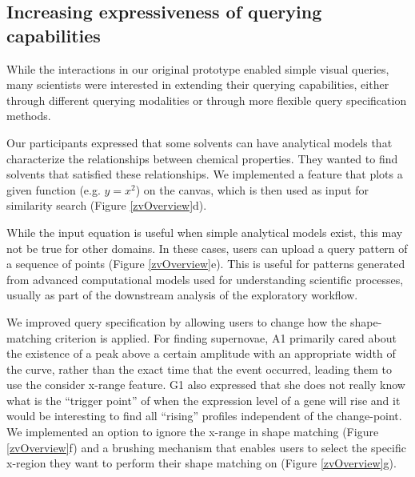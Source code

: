 \subsection{Increasing expressiveness of querying capabilities}
\par While the interactions in our original prototype enabled simple visual queries, many scientists were interested in extending their querying capabilities, either through different querying modalities or through more flexible query specification methods.  

 Our \matsci participants expressed that some solvents can have analytical models that characterize the relationships between chemical properties. They wanted to find solvents that satisfied these relationships. We implemented a feature that plots a given function (e.g. $y=x^2$) on the canvas, which is then used as input for similarity search (Figure \ref{zvOverview}d).

 While the input equation is useful when simple analytical models exist, this may not be true for other domains. In these cases, users can upload a query pattern of a sequence of points (Figure \ref{zvOverview}e). This is useful for patterns generated from advanced computational models used for understanding scientific processes, usually as part of the downstream analysis of the exploratory workflow. %

 We improved query specification by allowing users to change how the shape-matching criterion is applied. For finding supernovae, A1 primarily cared about the existence of a peak above a certain amplitude with an appropriate width of the curve, rather than the exact time that the event occurred, leading them to use the consider x-range feature. G1 also expressed that she does not really know what is the ``trigger point'' of when the expression level of a gene will rise and it would be interesting to find all ``rising'' profiles independent of the change-point.  We implemented an option to ignore the x-range in shape matching (Figure \ref{zvOverview}f) and a brushing mechanism that enables users to select the specific x-region they want to perform their shape matching on (Figure \ref{zvOverview}g). 
